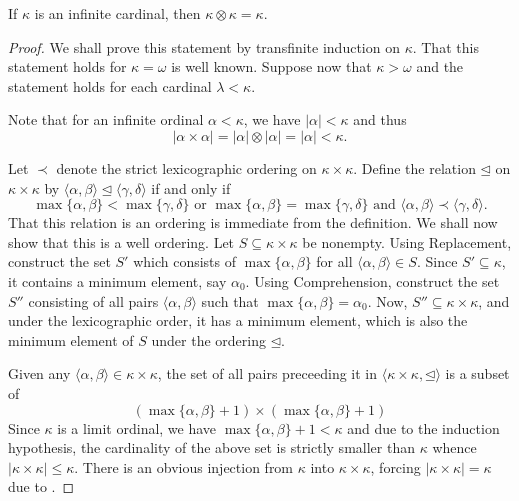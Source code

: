 \begin{theorem}[Tarski]
    If $\kappa$ is an infinite cardinal, then $\kappa\otimes\kappa = \kappa$.
\end{theorem}
\begin{proof}
    We shall prove this statement by transfinite induction on $\kappa$. That this statement holds for $\kappa = \omega$ is well known. Suppose now that $\kappa > \omega$ and the statement holds for each cardinal $\lambda < \kappa$.

    Note that for an infinite ordinal $\alpha < \kappa$, we have $|\alpha| < \kappa$ and thus 
    \begin{equation*}
        |\alpha\times\alpha| = |\alpha|\otimes|\alpha| = |\alpha| < \kappa.
    \end{equation*}

    Let $\prec$ denote the strict lexicographic ordering on $\kappa\times\kappa$. Define the relation $\unlhd$ on $\kappa\times\kappa$ by $\langle\alpha,\beta\rangle\unlhd\langle\gamma,\delta\rangle$ if and only if 
    \begin{equation*}
        \max\{\alpha,\beta\} < \max\{\gamma,\delta\}\text{ or }\max\{\alpha,\beta\} = \max\{\gamma,\delta\}\text{ and }\langle\alpha,\beta\rangle\prec\langle\gamma,\delta\rangle.
    \end{equation*}
    That this relation is an ordering is immediate from the definition. We shall now show that this is a well ordering. Let $S\subseteq\kappa\times\kappa$ be nonempty. Using Replacement, construct the set $S'$ which consists of $\max\{\alpha,\beta\}$ for all $\langle\alpha,\beta\rangle\in S$. Since $S'\subseteq\kappa$, it contains a minimum element, say $\alpha_0$. Using Comprehension, construct the set $S''$ consisting of all pairs $\langle\alpha,\beta\rangle$ such that $\max\{\alpha,\beta\} = \alpha_0$. Now, $S''\subseteq\kappa\times\kappa$, and under the lexicographic order, it has a minimum element, which is also the minimum element of $S$ under the ordering $\unlhd$.

    Given any $\langle\alpha,\beta\rangle\in\kappa\times\kappa$, the set of all pairs preceeding it in $\langle\kappa\times\kappa,\unlhd\rangle$ is a subset of 
    \begin{equation*}
        (\max\{\alpha,\beta\} + 1)\times(\max\{\alpha,\beta\} + 1)
    \end{equation*}
    Since $\kappa$ is a limit ordinal, we have $\max\{\alpha,\beta\} + 1 < \kappa$ and due to the induction hypothesis, the cardinality of the above set is strictly smaller than $\kappa$ whence $|\kappa\times\kappa|\le\kappa$. There is an obvious injection from $\kappa$ into $\kappa\times\kappa$, forcing $|\kappa\times\kappa| = \kappa$ due to .
\end{proof}

